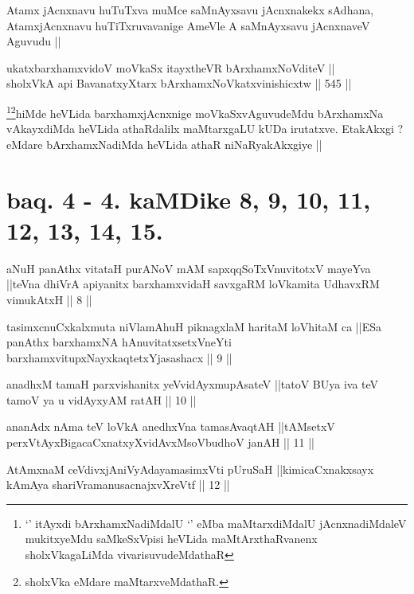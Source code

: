 \begin{artha}
Atamx jAcnxnavu huTuTxva muMce saMnAyxsavu jAcnxnakekx sAdhana,
AtamxjAcnxnavu huTiTxruvavanige AmeVle A saMnAyxsavu jAcnxnaveV
Aguvudu ||
\end{artha}

\begin{shl}
ukatxbarxhamxvidoV moVkaSx itayxtheVR bArxhamxNoVditeV || \\
sholxVkA api BavanatxyXtarx bArxhamxNoVkatxvinishicxtw ||  545 ||  
\end{shl}

\begin{artha}
\footnote{`\stext' itAyxdi bArxhamxNadiMdalU `\stext' eMba
  maMtarxdiMdalU jAcnxnadiMdaleV mukitxyeMdu saMkeSxVpisi heVLida
  maMtArxthaRvanenx sholxVkagaLiMda
  vivarisuvudeMdathaR}\footnote{sholxVka eMdare maMtarxveMdathaR.}hiMde heVLida barxhamxjAcnxnige moVkaSxvAguvudeMdu
bArxhamxNa vAkayxdiMda heVLida athaRdalilx maMtarxgaLU kUDa
irutatxve. EtakAkxgi ? eMdare bArxhamxNadiMda heVLida athaR
niNaRyakAkxgiye ||
\end{artha}

\section*{baq. 4 - 4. kaMDike 8, 9, 10, 11, 12, 13, 14, 15.}

\begin{shl}
aNuH panAthx vitataH purANoV mAM sapxqqSoTxV\s nuvitotxV mayeYva ||teVna dhiVrA apiyanitx barxhamxvidaH savxgaRM loVkamita UdhavxRM vimukAtxH || 8 ||
\end{shl}

\begin{shl}
tasimxcnuCxkalxmuta niVlamAhuH piknagxlaM haritaM loVhitaM ca ||ESa panAthx barxhamxNA hAnuvitatxsetxVneYti barxhamxvitupxNayxkaqtetxYjasashacx || 9 ||
\end{shl}

\begin{shl}
anadhxM tamaH parxvishanitx yeV\s vidAyxmupAsateV ||tatoV BUya iva teV tamoV ya u vidAyxyAM ratAH || 10 ||
\end{shl}

\begin{shl}
ananAdx nAma teV loVkA anedhxVna tamasAvaqtAH ||tAMsetxV perxVtAyxBigacaCxnatxyXvidAvxMsoV\s budhoV janAH || 11 ||
\end{shl}

\begin{shl}
AtAmxnaM ceVdivxjAniVyAdayamasimxVti pUruSaH ||kimicaCxnakxsayx kAmAya shariVramanusacnajxvXreVtf || 12 ||
\end{shl}

